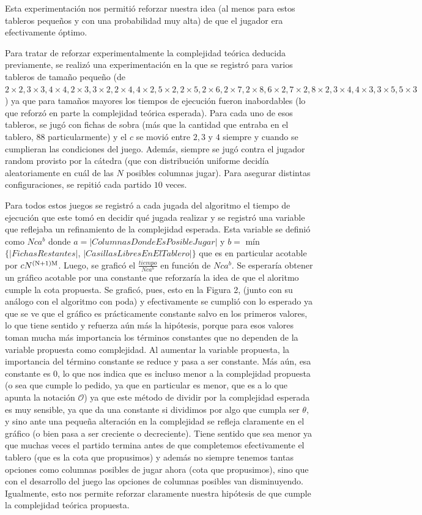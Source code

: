 \documentclass[A4paper,oneside,fleqn,11pt]{article}
\theoremstyle{definition}
\begin{document}
Esta experimentación nos permitió reforzar nuestra idea (al menos para estos tableros pequeños y con una probabilidad muy alta) de que el jugador era efectivamente óptimo.

Para tratar de reforzar experimentalmente la complejidad teórica deducida previamente, se realizó una experimentación en la que se registró para varios tableros de tamaño pequeño (de $2\times2, 3\times3, 4\times4, 2\times3, 3\times2, 2\times4, 4\times2, 5\times2, 2\times5, 2\times6, 2\times7, 2\times8, 6\times2, 7\times2, 8\times2, 3\times4, 4\times3, 3\times5, 5\times3$) ya que para tamaños mayores los tiempos de ejecución fueron inabordables (lo que reforzó en parte la complejidad teórica esperada). Para cada uno de esos tableros, se jugó con fichas de sobra (más que la cantidad que entraba en el tablero, 88 particularmente) y el $c$ se movió entre $2, 3$ y $4$ siempre y cuando se cumplieran las condiciones del juego. Además, siempre se jugó contra el jugador random provisto por la cátedra (que con distribución uniforme decidía aleatoriamente en cuál de las $N$ posibles columnas jugar). Para asegurar distintas configuraciones, se repitió cada partido $10$ veces. 


Para todos estos juegos se registró a cada jugada del algoritmo el tiempo de ejecución que este tomó en decidir qué jugada realizar y se registró una variable que reflejaba un refinamiento de la complejidad esperada. Esta variable se definió como $Nca^b$ donde $a=|Columnas Donde Es Posible Jugar|$ y $b =$ mín$\{|FichasRestantes|$, $|Casillas Libres En El Tablero|\}$ que es en particular acotable por $cN\textsuperscript{(N+1)M}$. Luego, se graficó el $\frac{tiempo}{Nca^b}$ en función de $Nca^b$. Se esperaría obtener un gráfico acotable por una constante que reforzaría la idea de que el aloritmo cumple la cota propuesta. Se graficó, pues, esto en la Figura 2, (junto con su análogo con el algoritmo con poda) y efectivamente se cumplió con lo esperado ya que se ve que el gráfico es prácticamente constante salvo en los primeros valores, lo que tiene sentido y refuerza aún más la hipótesis, porque para esos valores toman mucha más importancia los términos constantes que no dependen de la variable propuesta como complejidad. Al aumentar la variable propuesta, la importancia del término constante se reduce y pasa a ser constante. Más aún, esa constante es $0$, lo que nos indica que es incluso menor a la complejidad propuesta (o sea que cumple lo pedido, ya que en particular es menor, que es a lo que apunta la notación $\mathcal{O}$) ya que este método de dividir por la complejidad esperada es muy sensible, ya que da una constante si dividimos por algo que cumpla ser $\mathcal{\theta}$, y sino ante una pequeña alteración en la complejidad se refleja claramente en el gráfico (o bien pasa a ser creciente o decreciente). Tiene sentido que sea menor ya que muchas veces el partido termina antes de que completemos efectivamente el tablero (que es la cota que propusimos) y además no siempre tenemos tantas opciones como columnas posibles de jugar ahora (cota que propusimos), sino que con el desarrollo del juego las opciones de columnas posibles van disminuyendo. Igualmente, esto nos permite reforzar claramente nuestra hipótesis de que cumple la complejidad teórica propuesta.
\end{document}
